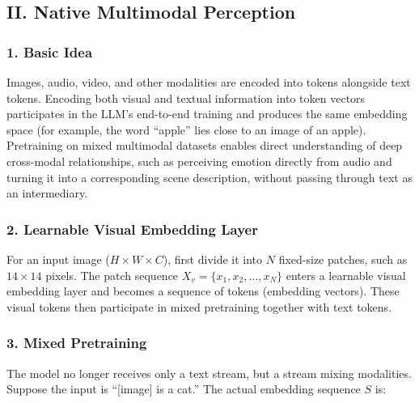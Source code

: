 \hypertarget{ii.-native-multimodal-perception}{%
\subsection{II. Native Multimodal Perception}\label{ii.-native-multimodal-perception}}

\hypertarget{basic-idea-1}{%
\subsubsection{1. Basic Idea}\label{basic-idea-1}}

Images, audio, video, and other modalities are encoded into tokens alongside text tokens. Encoding both visual and textual information into token vectors participates in the LLM's end-to-end training and produces the same embedding space (for example, the word ``apple'' lies close to an image of an apple). Pretraining on mixed multimodal datasets enables direct understanding of deep cross-modal relationships, such as perceiving emotion directly from audio and turning it into a corresponding scene description, without passing through text as an intermediary.

\hypertarget{learnable-visual-embedding-layer}{%
\subsubsection{2. Learnable Visual Embedding Layer}\label{learnable-visual-embedding-layer}}

For an input image (\(H\times W\times C\)), first divide it into \(N\) fixed-size patches, such as \(14\times14\) pixels. The patch sequence \(X_v=\{x_1,x_2,\ldots,x_N\}\) enters a learnable visual embedding layer and becomes a sequence of tokens (embedding vectors). These visual tokens then participate in mixed pretraining together with text tokens.

\hypertarget{mixed-pretraining}{%
\subsubsection{3. Mixed Pretraining}\label{mixed-pretraining}}

The model no longer receives only a text stream, but a stream mixing modalities. Suppose the input is ``{[}image{]} is a cat.'' The actual embedding sequence \(S\) is:

